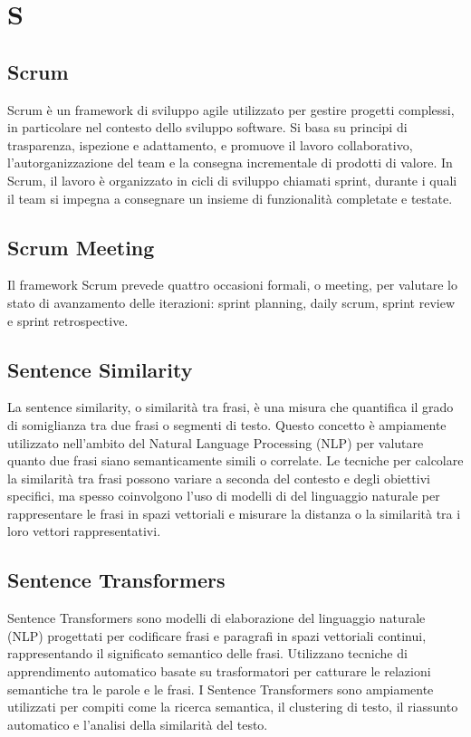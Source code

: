 \section{S}

\vspace{2em}
\subsection*{Scrum}
\par Scrum è un framework di sviluppo agile utilizzato per gestire progetti complessi, in particolare nel contesto dello sviluppo software. Si basa su principi di trasparenza, ispezione e adattamento, e promuove il lavoro collaborativo, l'autorganizzazione del team e la consegna incrementale di prodotti di valore. In Scrum, il lavoro è organizzato in cicli di sviluppo chiamati sprint, durante i quali il team si impegna a consegnare un insieme di funzionalità completate e testate.

\vspace{2em}
\subsection*{Scrum Meeting}
\par Il framework Scrum prevede quattro occasioni formali, o meeting, per valutare lo stato di avanzamento delle iterazioni: sprint planning, daily scrum, sprint review e sprint retrospective.

\vspace{2em}
\subsection*{Sentence Similarity}
\par La sentence similarity, o similarità tra frasi, è una misura che quantifica il grado di somiglianza tra due frasi o segmenti di testo. Questo concetto è ampiamente utilizzato nell'ambito del Natural Language Processing (NLP) per valutare quanto due frasi siano semanticamente simili o correlate. Le tecniche per calcolare la similarità tra frasi possono variare a seconda del contesto e degli obiettivi specifici, ma spesso coinvolgono l'uso di modelli di  del linguaggio naturale per rappresentare le frasi in spazi vettoriali e misurare la distanza o la similarità tra i loro vettori rappresentativi.

\vspace{2em}
\subsection*{Sentence Transformers}
\par Sentence Transformers sono modelli di elaborazione del linguaggio naturale (NLP) progettati per codificare frasi e paragrafi in spazi vettoriali continui, rappresentando il significato semantico delle frasi. Utilizzano tecniche di apprendimento automatico basate su trasformatori per catturare le relazioni semantiche tra le parole e le frasi. I Sentence Transformers sono ampiamente utilizzati per compiti come la ricerca semantica, il clustering di testo, il riassunto automatico e l'analisi della similarità del testo.


